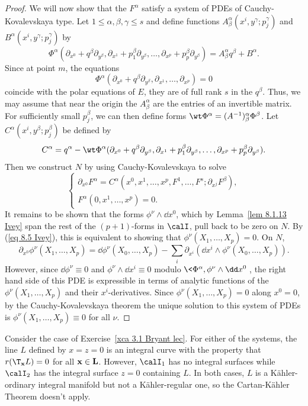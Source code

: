 \begin{proof}
    We will now show that the $F^\alpha$ satisfy a system of PDEs of Cauchy-Kovalevskaya type. Let $1\leq \alpha,\beta,\gamma\leq s$ and define functions $A^\alpha_\beta(x^i,y^\gamma;p^\gamma_j)$ and $B^\alpha(x^i,y^\gamma;p^\gamma_j)$ by 
    \[\Phi^\alpha(\partial_{x^0}+q^\beta\partial_{y^\beta},\partial_{x^1}+p_1^\beta\partial_{y^\beta},\ldots,\partial_{x^p}+p^\beta_p\partial_{y^\beta})=A^\alpha_\beta q^\beta+B^\alpha.\]
    Since at point $m$, the equations \
    \[\Phi^\alpha(\partial_{x^0}+q^\beta\partial_{y^\beta},\partial_{x^1},\ldots,\partial_{x^p})=0\]
    coincide with the polar equations of $E$, they are of full rank $s$ in the $q^\beta$. Thus, we may assume that near the origin the $A^\alpha_\beta$ are the entries of an invertible matrix. For sufficiently small $p^\beta_j$, we can then define forms $\wt\Phi^\alpha=(A^{-1})^\alpha_\beta\Phi^\beta$. Let $C^\alpha(x^i,y^\beta;p^\beta_j)$ be defined by 
    \[C^\alpha=q^\alpha-\wt\Phi^\alpha(\partial_{x^0}+q^\beta\partial_{y^\beta},\partial_{x^1}+p^\beta_1\partial_{y^\beta},\ldots,\partial_{x^p}+p^\beta_p\partial_{y^\beta}).\]
    Then we construct $N$ by using Cauchy-Kovalevskaya to solve 
    \[\left\{\begin{array}{l}
        \partial_{x^0}F^\alpha=C^\alpha(x^0,x^1,\ldots,x^p,F^1,\ldots,F^s;\partial_{x^j}F^\beta),\\
        F^\alpha(0,x^1,\ldots,x^p)=0.
        \end{array}\right.
    \]
    It remains to be shown that the forms $\phi^\nu\wedge\dd x^0$, which by Lemma~\ref{lem 8.1.13 Ivey} span the rest of the $(p+1)$-forms in $\calI$, pull back to be zero on $N$. By (\ref{eq 8.5 Ivey}), this is equivalent to showing that $\phi^\nu(X_1,\ldots,X_p)=0$. On $N$,
    \[\partial_{x^0}\phi^\nu(X_1,\ldots,X_p)=\dd\phi^\nu(X_0,\ldots,X_p)-\sum_i\partial_{x^i}\left(\dd x^i\wedge \phi^\nu(X_0,\ldots,X_p)\right).\]
    However, since $\dd\phi^\nu\equiv 0$ and $\phi^\nu\wedge\dd x^i\equiv 0$ modulo $\<\Phi^\alpha,\phi^\nu\wedge\dd x^0\>$, the right hand side of this PDE is expressible in terms of analytic functions of the $\phi^\nu(X_1,\ldots,X_p)$ and their $x^i$-derivatives. Since $\phi^\nu(X_1,\ldots,X_p)=0$ along $x^0=0$, by the Cauchy-Kovalevskaya theorem the unique solution to this system of PDEs is $\phi^\nu(X_1,\ldots,X_p)\equiv 0$ for all $\nu$.
\end{proof}

\begin{example}
    Consider the case of Exercise~\ref{xca 3.1 Bryant lec}. For either of the systems, the line $L$ defined by $x=z=0$ is an integral curve with the property that $r(\T_{\bf{x}} L)=0$ for all $\bf{x}\in L$. However, $\calI_1$ has no integral surfaces while $\calI_2$ has the integral surface $z=0$ containing $L$. In both cases, $L$ is a K\"ahler-ordinary integral manifold but not a K\"ahler-regular one, so the Cartan-K\"ahler Theorem doesn't apply.
\end{example}

